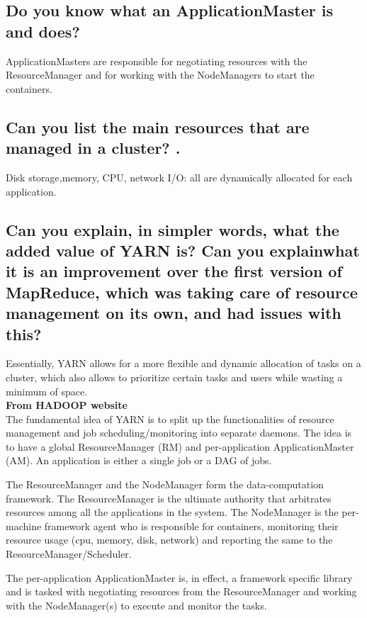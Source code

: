 \documentclass{article}
\begin{document}
\subsection{Do you know what an ApplicationMaster is and does?}
ApplicationMasters are responsible for negotiating resources with the ResourceManager and for working with the NodeManagers to start the containers.

\subsection{Can you list the main resources that are managed in a cluster? .}
Disk storage,memory, CPU, network I/O: all are dynamically allocated for each application.

\subsection{Can you explain, in simpler words, what the added value of YARN is? Can you explainwhat it is an improvement over the first version of MapReduce, which was taking care of resource management on its own, and had issues with this?}

Essentially, YARN allows for a more flexible and dynamic allocation of tasks on a cluster, which also allows to prioritize certain tasks and users while wasting a minimum of space.\\

\textbf{From HADOOP website}\\

The fundamental idea of YARN is to split up the functionalities of resource management and job scheduling/monitoring into separate daemons. The idea is to have a global ResourceManager (RM) and per-application ApplicationMaster (AM). An application is either a single job or a DAG of jobs.

The ResourceManager and the NodeManager form the data-computation framework. The ResourceManager is the ultimate authority that arbitrates resources among all the applications in the system. The NodeManager is the per-machine framework agent who is responsible for containers, monitoring their resource usage (cpu, memory, disk, network) and reporting the same to the ResourceManager/Scheduler.

The per-application ApplicationMaster is, in effect, a framework specific library and is tasked with negotiating resources from the ResourceManager and working with the NodeManager(s) to execute and monitor the tasks.
\end{document}
